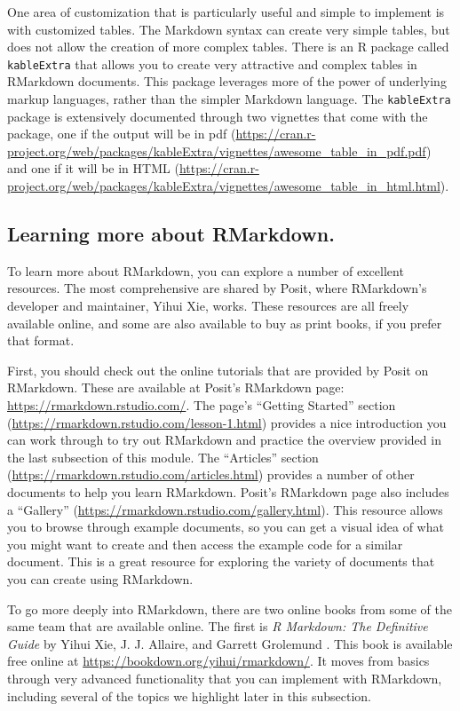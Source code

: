 \documentclass[]{tufte-book}
\begin{document}
One area of customization that is particularly useful and simple to implement is
with customized tables. The Markdown syntax can create very simple tables, but
does not allow the creation of more complex tables. There is an R package called
\texttt{kableExtra} that allows you to create very attractive and complex tables
in RMarkdown documents.
This package leverages more of the power of underlying markup languages, rather
than the simpler Markdown language.
The
\texttt{kableExtra} package is extensively documented through two vignettes that come
with the package, one if the output will be in pdf
(\url{https://cran.r-project.org/web/packages/kableExtra/vignettes/awesome_table_in_pdf.pdf})
and one if it will be in HTML
(\url{https://cran.r-project.org/web/packages/kableExtra/vignettes/awesome_table_in_html.html}).

\subsection{Learning more about RMarkdown.}\label{learning-more-about-rmarkdown.}

To learn more about RMarkdown, you can explore a number of excellent resources.
The most comprehensive are shared by Posit, where RMarkdown's developer
and maintainer, Yihui Xie, works. These resources are all freely available
online, and some are also available to buy as print books, if you prefer that
format.

First, you should check out the online tutorials that are provided by Posit on
RMarkdown. These are available at Posit's RMarkdown page:
\url{https://rmarkdown.rstudio.com/}. The page's ``Getting Started'' section
(\url{https://rmarkdown.rstudio.com/lesson-1.html}) provides a nice introduction you
can work through to try out RMarkdown and practice the overview provided in the
last subsection of this module. The ``Articles'' section
(\url{https://rmarkdown.rstudio.com/articles.html}) provides a number of other
documents to help you learn RMarkdown. Posit's RMarkdown page also includes a
``Gallery'' (\url{https://rmarkdown.rstudio.com/gallery.html}). This resource allows you
to browse through example documents, so you can get a visual idea of what you
might want to create and then access the example code for a similar document.
This is a great resource for exploring the variety of documents that you can
create using RMarkdown.

To go more deeply into RMarkdown, there are two online books from some of the
same team that are available online. The first is \emph{R Markdown: The Definitive
Guide} by Yihui Xie, J. J. Allaire, and Garrett Grolemund \citep{xie2018r}. This book is
available free online at \url{https://bookdown.org/yihui/rmarkdown/}. It moves from
basics through very advanced functionality that you can implement with
RMarkdown, including several of the topics we highlight later in this
subsection.
\end{document}
